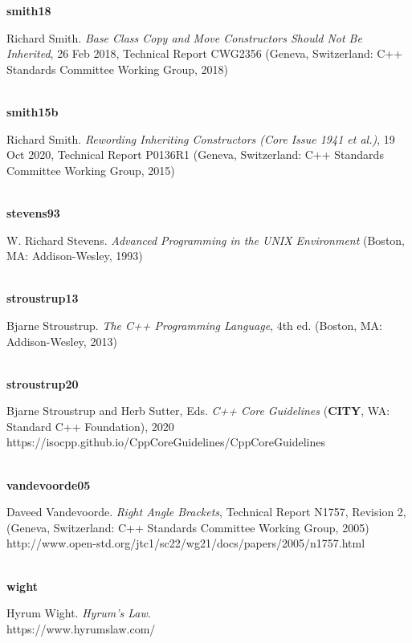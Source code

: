 \noindent\textbf{smith18}\\
\hspace*{2em}\parbox[t]{\textwidth}{Richard Smith. \textit{Base Class Copy and Move Constructors Should Not Be Inherited}, 26 Feb 2018, Technical Report CWG2356 (Geneva, Switzerland: C++ Standards Committee Working Group, 2018)}\\

\noindent\textbf{smith15b}\\
\hspace*{2em}\parbox[t]{\textwidth}{Richard Smith. \textit{Rewording Inheriting Constructors (Core Issue 1941 et al.)},  19 Oct 2020, Technical Report P0136R1 (Geneva, Switzerland: C++ Standards Committee Working Group, 2015)}\\

\noindent\textbf{stevens93}\\
\hspace*{2em}\parbox[t]{\textwidth}{W. Richard Stevens. \textit{Advanced Programming in the UNIX Environment} (Boston, MA: Addison-Wesley, 1993)} \\

\noindent\textbf{stroustrup13}\\
\hspace*{2em}\parbox[t]{\textwidth}{Bjarne Stroustrup. \textit{The C++ Programming Language}, 4th ed. (Boston, MA: Addison-Wesley, 2013)} \\

\noindent\textbf{stroustrup20}\\
\hspace*{2em}\parbox[t]{\textwidth}{Bjarne Stroustrup and Herb Sutter, Eds. \textit{C++ Core Guidelines} (\textbf{CITY}, WA: Standard C++ Foundation), 2020\\
https://isocpp.github.io/CppCoreGuidelines/CppCoreGuidelines} \\

\noindent\textbf{vandevoorde05}\\
\hspace*{2em}\parbox[t]{\textwidth}{Daveed Vandevoorde. \textit{Right Angle Brackets}, Technical Report N1757, Revision 2, (Geneva, Switzerland: C++ Standards Committee Working Group, 2005)\\
http://www.open-std.org/jtc1/sc22/wg21/docs/papers/2005/n1757.html}\\

\noindent\textbf{wight}\\
\hspace*{2em}\parbox[t]{\textwidth}{Hyrum Wight. \textit{Hyrum's Law}.\\
https://www.hyrumslaw.com/}\\




